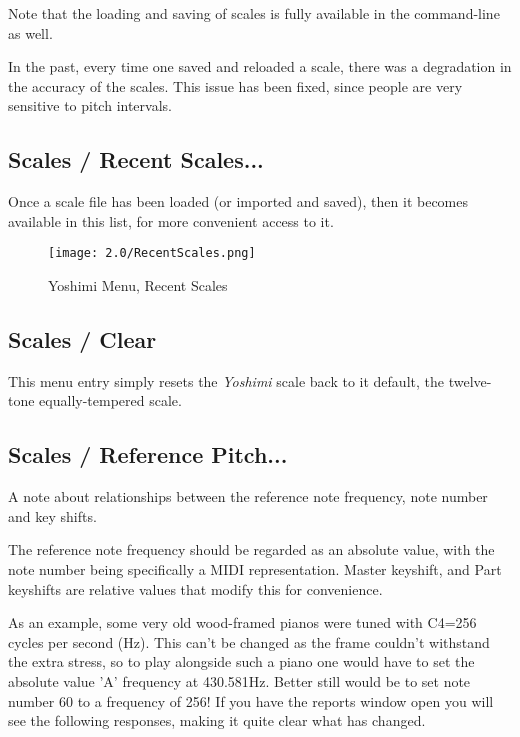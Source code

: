    Note that the loading and saving of scales is fully available in the
   command-line as well.

   In the past, every time one saved and reloaded a scale, there was a
   degradation in the accuracy of the scales.  This issue has been fixed, since
   people are very sensitive to pitch intervals.

\subsection{Scales / Recent Scales...}
\label{subsec:scales_recent_scales}

   Once a scale file has been loaded (or imported and saved), then it
   becomes available in this list, for more convenient access to it.

\begin{figure}[H]
   \centering
   \texttt{[image: 2.0/RecentScales.png]}
   \caption{Yoshimi Menu, Recent Scales}
   \label{fig:yoshimi_recent_scales}
\end{figure}

\subsection{Scales / Clear}
\label{subsec:scales_clear}

   This menu entry simply resets the \textsl{Yoshimi} scale back to it default,
   the twelve-tone equally-tempered scale.

\subsection{Scales / Reference Pitch...}
\label{subsec:scales_reference_pitch}
   A note about relationships between the reference note frequency, note number
   and key shifts.

   The reference note frequency should be regarded as an absolute value, with the
   note number being specifically a MIDI representation.
   Master keyshift, and Part keyshifts are relative values that modify this for
   convenience.

   As an example, some very old wood-framed pianos were tuned with C4=256 cycles
   per second (Hz). This can't be changed as the frame couldn't withstand the
   extra stress, so to play alongside such a piano one would have to set the
   absolute value 'A' frequency at 430.581Hz. Better still would be to set note
   number 60 to a frequency of 256! If you have the reports window open you will see the following responses, making it quite clear what has changed.


